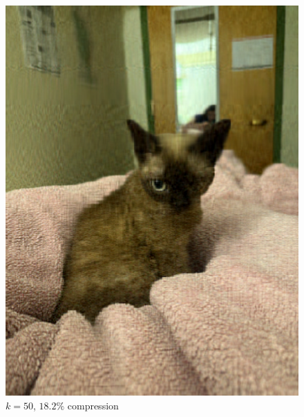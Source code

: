 \begin{figure}[H]
  \centering
  \begin{minipage}[b]{0.4\textwidth}
    \includegraphics[width=\textwidth]{images/compressed_cat_50.png}
    \caption{$k = 50$, $18.2\%$ compression}
  \end{minipage}
  \hfill
  \begin{minipage}[b]{0.4\textwidth}

\end{minipage}
\end{figure}
